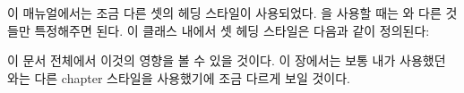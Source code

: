 이 매뉴얼에서는 조금 다른 셋의 헤딩 스타일이 사용되었다.
\cmd{\makeheadstyles}을 사용할 때는 와 다른 것들만 특정해주면 된다.
이 클래스 내에서  셋 헤딩 스타일은 다음과 같이 정의된다:
\begin{lcode}
\newcommand*{\addperiod}[1]{#1.}
\end{lcode}
이 문서 전체에서 이것의 영향을 볼 수 있을 것이다.
이 장에서는 보통 내가 사용했던 와는 다른
 chapter 스타일을 사용했기에 조금 다르게 보일 것이다.

